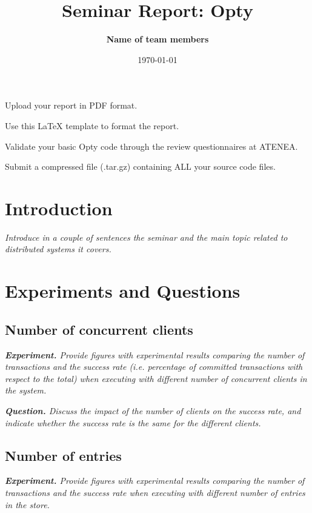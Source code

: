 \documentclass[a4paper, 10pt]{article}
\title{Seminar Report: Opty}
\author{\textbf{Name of team members}}
\date{\normalsize\today{}}
\begin{document}
\maketitle

\begin{center}
Upload your report in PDF format.
  
Use this LaTeX template to format the report.
  
Validate your basic Opty code through the review questionnaires at ATENEA.

Submit a compressed file (.tar.gz) containing ALL your source code files.
\end{center}

\section{Introduction}

\textit{Introduce in a couple of sentences the seminar and the main topic related to distributed systems it covers.}

\section{Experiments and Questions}

\subsection{Number of concurrent clients}

\textit{\textbf{Experiment.} Provide figures with experimental results comparing the number of transactions and the success rate (i.e. percentage of committed transactions with respect to the total) when executing with different number of concurrent clients in the system.}

{\setlength{\parskip}{10pt}\noindent\textit{\textbf{Question.} Discuss the impact of the number of clients on the success rate, and indicate whether the success rate is the same for the different clients.}}

\subsection{Number of entries}

\textit{\textbf{Experiment.} Provide figures with experimental results comparing the number of transactions and the success rate when executing with different number of entries in the store.}
\end{document}
